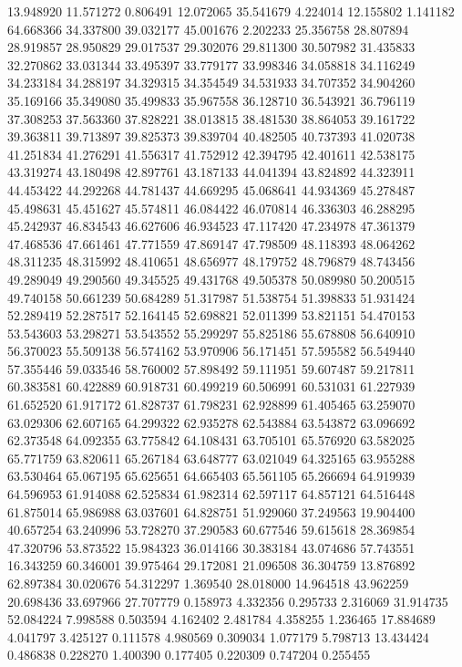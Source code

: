 13.948920
11.571272
0.806491
12.072065
35.541679
4.224014
12.155802
1.141182
64.668366
34.337800
39.032177
45.001676
2.202233
25.356758
28.807894
28.919857
28.950829
29.017537
29.302076
29.811300
30.507982
31.435833
32.270862
33.031344
33.495397
33.779177
33.998346
34.058818
34.116249
34.233184
34.288197
34.329315
34.354549
34.531933
34.707352
34.904260
35.169166
35.349080
35.499833
35.967558
36.128710
36.543921
36.796119
37.308253
37.563360
37.828221
38.013815
38.481530
38.864053
39.161722
39.363811
39.713897
39.825373
39.839704
40.482505
40.737393
41.020738
41.251834
41.276291
41.556317
41.752912
42.394795
42.401611
42.538175
43.319274
43.180498
42.897761
43.187133
44.041394
43.824892
44.323911
44.453422
44.292268
44.781437
44.669295
45.068641
44.934369
45.278487
45.498631
45.451627
45.574811
46.084422
46.070814
46.336303
46.288295
45.242937
46.834543
46.627606
46.934523
47.117420
47.234978
47.361379
47.468536
47.661461
47.771559
47.869147
47.798509
48.118393
48.064262
48.311235
48.315992
48.410651
48.656977
48.179752
48.796879
48.743456
49.289049
49.290560
49.345525
49.431768
49.505378
50.089980
50.200515
49.740158
50.661239
50.684289
51.317987
51.538754
51.398833
51.931424
52.289419
52.287517
52.164145
52.698821
52.011399
53.821151
54.470153
53.543603
53.298271
53.543552
55.299297
55.825186
55.678808
56.640910
56.370023
55.509138
56.574162
53.970906
56.171451
57.595582
56.549440
57.355446
59.033546
58.760002
57.898492
59.111951
59.607487
59.217811
60.383581
60.422889
60.918731
60.499219
60.506991
60.531031
61.227939
61.652520
61.917172
61.828737
61.798231
62.928899
61.405465
63.259070
63.029306
62.607165
64.299322
62.935278
62.543884
63.543872
63.096692
62.373548
64.092355
63.775842
64.108431
63.705101
65.576920
63.582025
65.771759
63.820611
65.267184
63.648777
63.021049
64.325165
63.955288
63.530464
65.067195
65.625651
64.665403
65.561105
65.266694
64.919939
64.596953
61.914088
62.525834
61.982314
62.597117
64.857121
64.516448
61.875014
65.986988
63.037601
64.828751
51.929060
37.249563
19.904400
40.657254
63.240996
53.728270
37.290583
60.677546
59.615618
28.369854
47.320796
53.873522
15.984323
36.014166
30.383184
43.074686
57.743551
16.343259
60.346001
39.975464
29.172081
21.096508
36.304759
13.876892
62.897384
30.020676
54.312297
1.369540
28.018000
14.964518
43.962259
20.698436
33.697966
27.707779
0.158973
4.332356
0.295733
2.316069
31.914735
52.084224
7.998588
0.503594
4.162402
2.481784
4.358255
1.236465
17.884689
4.041797
3.425127
0.111578
4.980569
0.309034
1.077179
5.798713
13.434424
0.486838
0.228270
1.400390
0.177405
0.220309
0.747204
0.255455
